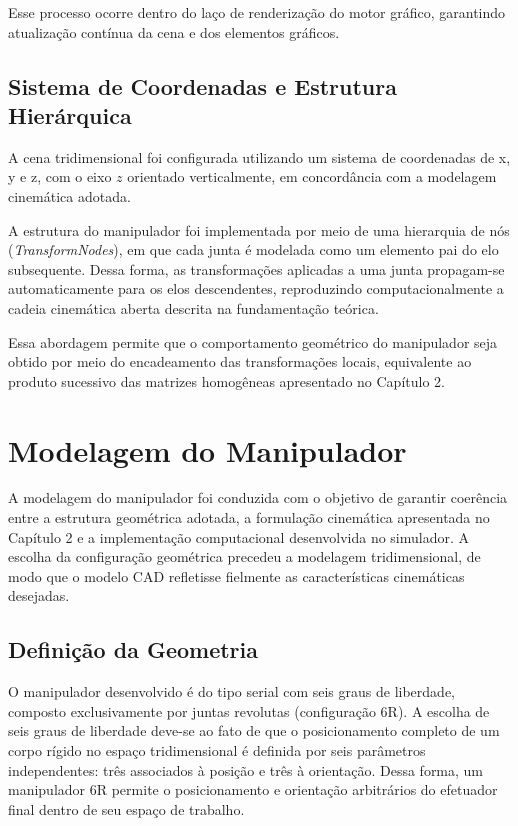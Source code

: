 
Esse processo ocorre dentro do laço de renderização do motor gráfico, garantindo atualização contínua da cena e dos elementos gráficos.

\subsection{Sistema de Coordenadas e Estrutura Hierárquica}

A cena tridimensional foi configurada utilizando um sistema de coordenadas de x, y e z, com o eixo $z$ orientado verticalmente, em concordância com a modelagem cinemática adotada.

A estrutura do manipulador foi implementada por meio de uma hierarquia de nós (\textit{TransformNodes}), em que cada junta é modelada como um elemento pai do elo subsequente. Dessa forma, as transformações aplicadas a uma junta propagam-se automaticamente para os elos descendentes, reproduzindo computacionalmente a cadeia cinemática aberta descrita na fundamentação teórica.

Essa abordagem permite que o comportamento geométrico do manipulador seja obtido por meio do encadeamento das transformações locais, equivalente ao produto sucessivo das matrizes homogêneas apresentado no Capítulo 2.

\section{Modelagem do Manipulador}

A modelagem do manipulador foi conduzida com o objetivo de garantir coerência entre a estrutura geométrica adotada, a formulação cinemática apresentada no Capítulo 2 e a implementação computacional desenvolvida no simulador. A escolha da configuração geométrica precedeu a modelagem tridimensional, de modo que o modelo CAD refletisse fielmente as características cinemáticas desejadas.

\subsection{Definição da Geometria}

O manipulador desenvolvido é do tipo serial com seis graus de liberdade, composto exclusivamente por juntas revolutas (configuração 6R). A escolha de seis graus de liberdade deve-se ao fato de que o posicionamento completo de um corpo rígido no espaço tridimensional é definida por seis parâmetros independentes: três associados à posição e três à orientação. Dessa forma, um manipulador 6R permite o posicionamento e orientação arbitrários do efetuador final dentro de seu espaço de trabalho.

